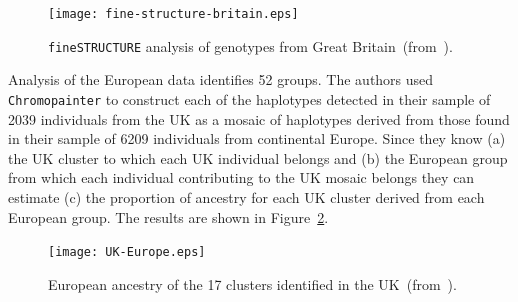 \documentclass[12pt]{article}
\begin{document}
\begin{figure}
\begin{center}
\texttt{[image: fine-structure-britain.eps]}
\end{center}
\caption{{\tt fineSTRUCTURE} analysis of genotypes from Great Britain~(from~\cite{Leslie-etal-2015}).}\label{fig:fine-structure}
\end{figure}

Analysis of the European data identifies 52 groups. The authors used
{\tt Chromopainter} to construct each of the haplotypes detected in
their sample of 2039 individuals from the UK as a mosaic of haplotypes
derived from those found in their sample of 6209 individuals from
continental Europe. Since they know (a) the UK cluster to which each
UK individual belongs and (b) the European group from which each
individual contributing to the UK mosaic belongs they can estimate (c)
the proportion of ancestry for each UK cluster derived from each
European group. The results are shown in Figure~\ref{fig:UK-Europe}.

\begin{figure}
\begin{center}
\texttt{[image: UK-Europe.eps]}
\end{center}
\caption{European ancestry of the 17 clusters identified in the UK~(from~\cite{Leslie-etal-2015}).}\label{fig:UK-Europe}
\end{figure}




\ccLicense
\end{document}
